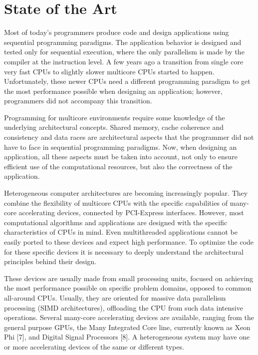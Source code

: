 
\chapter{State of the Art}

Most of today’s programmers produce code and design applications using sequential programming paradigms. The application behavior is designed and tested only for sequential execution, where the only parallelism is made by the compiler at the instruction level. A few years ago a transition from single core very fast CPUs to slightly slower multicore CPUs started to happen. Unfortunately, these newer CPUs need a different programming paradigm to get the most performance possible when designing an application; however, programmers did not accompany this transition.

Programming for multicore environments require some knowledge of the underlying architectural concepts. Shared memory, cache coherence and consistency and data races are architectural aspects that the programmer did not have to face in sequential programming paradigms. Now, when designing an application, all these aspects must be taken into account, not only to ensure efficient use of the computational resources, but also the correctness of the application.

Heterogeneous computer architectures are becoming increasingly popular. They combine the flexibility of multicore CPUs with the specific capabilities of many-core accelerating devices, connected by PCI-Express interfaces. However, most computational algorithms and applications are designed with the specific characteristics of CPUs in mind. Even multithreaded applications cannot be easily ported to these devices and expect high performance. To optimize the code for these specific devices it is necessary to deeply understand the architectural principles behind their design.

These devices are usually made from small processing units, focused on achieving the most performance possible on specific problem domains, opposed to common all-around CPUs. Usually, they are oriented for massive data parallelism processing (SIMD architectures), offloading the CPU from such data intensive operations. Several many-core accelerating devices are available, ranging from the general purpose GPUs, the \intel Many Integrated Core line, currently known as \intel Xeon Phi [7], and Digital Signal Processors [8]. A heterogeneous system may have one or more accelerating devices of the same or different types.

